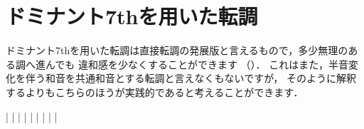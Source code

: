 \documentclass[dvipdfmx,uplatex,b5paper,openany,jbase=12Q,nomag*,textwidth-limit=44%
               ]{gachimuchi}
\begin{document}
\section{ドミナント7thを用いた転調}
ドミナント7thを用いた転調は直接転調の発展版と言えるもので，多少無理のある調へ進んでも
違和感を少なくすることができます
（）．
これはまた，半音変化を伴う和音を共通和音とする転調と言えなくもないですが，
そのように解釈するよりもこちらのほうが実践的であると考えることができます．
\begin{floatMusic}[pos=ht]
  \generalmeter{\meterC}%
  \Startpiece
  \NOtes
  \figbassuuu[6]%
  \figbassuuu[3][\txSharp4][6]%
  \figbassuuu[6]%
  |%
  \en\bar
  \NOtes
  \figbassuuu[\txSharp][7]%
  \figbassuuu[\txSharp][6]%
  \figbassuuu[\txFlat5][\txSharp6]%
  \figbassuuu[\txSharp]%
  |%
  \en\bar\addspace{.5\afterruleskip}%
  \NOtes
  \figbassuuu[6]%
  \figbassuuuu[3][4][\txSharp6]%
  \figbassuuuu[6]%
  \figbassuuuu[\txFlat][5][6]%
  |%
  \en\bar%
  \NOtes
  \figbassuuuu[4][6]%
  \figbassuuuu[---][---]\sk%
  \figbassuuuu[3][5]%
  \figbassuuuu[7]\sk%
  |%
  \en\bar%
  \NOTes
  |%
  \en\setdoublebar%
  \endpiece
\end{floatMusic}
\end{document}
